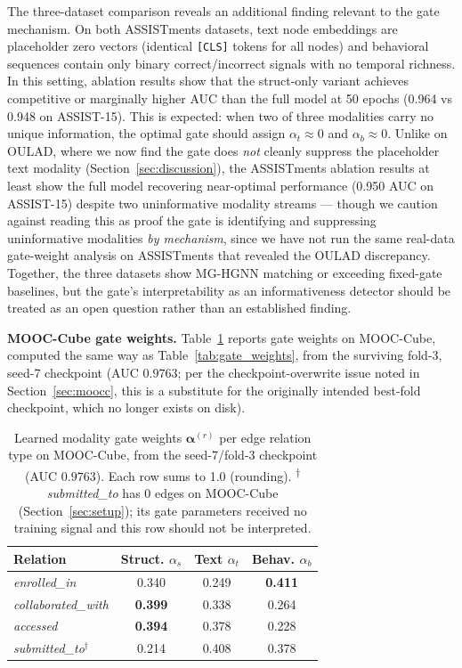\documentclass[sigconf,review]{acmart}
\begin{document}
The three-dataset comparison reveals an additional
finding relevant to the gate mechanism. On both
ASSISTments datasets, text node embeddings are
placeholder zero vectors (identical \texttt{[CLS]}
tokens for all nodes) and behavioral sequences
contain only binary correct/incorrect signals with
no temporal richness. In this setting, ablation
results show that the struct-only variant achieves
competitive or marginally higher AUC than the full
model at 50 epochs (0.964 vs 0.948 on ASSIST-15).
This is expected: when two of three modalities carry
no unique information, the optimal gate should assign
$\alpha_t \approx 0$ and $\alpha_b \approx 0$. Unlike
on OULAD, where we now find the gate does
\emph{not} cleanly suppress the placeholder text
modality (Section~\ref{sec:discussion}), the
ASSISTments ablation results at least show the full
model recovering near-optimal performance (0.950 AUC
on ASSIST-15) despite two uninformative modality
streams --- though we caution against reading this
as proof the gate is identifying and suppressing
uninformative modalities \emph{by mechanism}, since
we have not run the same real-data gate-weight
analysis on ASSISTments that revealed the OULAD
discrepancy. Together, the three datasets show MG-HGNN
matching or exceeding fixed-gate baselines, but the
gate's interpretability as an informativeness
detector should be treated as an open question rather
than an established finding.

\textbf{MOOC-Cube gate weights.} Table~\ref{tab:moocc_gate}
reports gate weights on MOOC-Cube, computed the same
way as Table~\ref{tab:gate_weights}, from the surviving
fold-3, seed-7 checkpoint (AUC $0.9763$; per the
checkpoint-overwrite issue noted in
Section~\ref{sec:moocc}, this is a substitute for the
originally intended best-fold checkpoint, which no
longer exists on disk).

\begin{table}[t]
\centering
\caption{Learned modality gate weights
$\boldsymbol{\alpha}^{(r)}$ per edge relation type on
MOOC-Cube, from the seed-7/fold-3 checkpoint (AUC
$0.9763$). Each row sums to 1.0 (rounding).
\textsuperscript{$\dagger$}\textit{submitted\_to} has
0 edges on MOOC-Cube (Section~\ref{sec:setup}); its
gate parameters received no training signal and this
row should not be interpreted.}
\label{tab:moocc_gate}
\begin{tabular}{lccc}
\toprule
\textbf{Relation}
  & \textbf{Struct.} $\alpha_s$
  & \textbf{Text} $\alpha_t$
  & \textbf{Behav.} $\alpha_b$ \\
\midrule
\textit{enrolled\_in}       & 0.340 & 0.249 & \textbf{0.411} \\
\textit{collaborated\_with} & \textbf{0.399} & 0.338 & 0.264 \\
\textit{accessed}           & \textbf{0.394} & 0.378 & 0.228 \\
\textit{submitted\_to}$^\dagger$ & 0.214 & 0.408 & 0.378 \\
\bottomrule
\end{tabular}
\end{table}
\end{document}
